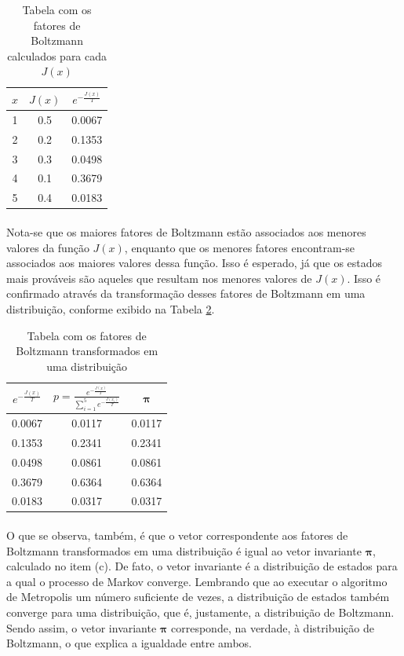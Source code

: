 \documentclass{report}
\begin{document}
\begin{table}[H]
	\centering
	\begin{tabular}{c|c|c}
	$x$ & $J(x)$ & $e^{- \frac{J(x)}{T}}$ \\ 
	\hline 
	1 & 0.5 & 0.0067 \\ 
	\hline 
	2 & 0.2 & 0.1353 \\ 
	\hline 
	3 & 0.3 & 0.0498 \\ 
	\hline 
	4 & 0.1 & 0.3679 \\ 
	\hline 
	5 & 0.4 & 0.0183 \\ 
	\end{tabular} 
	\caption{Tabela com os fatores de Boltzmann calculados para cada $J(x)$}
	\label{tabela_fatores_boltzmann}
\end{table}

\paragraph{} Nota-se que os maiores fatores de Boltzmann estão associados aos menores valores da função $J(x)$, enquanto que os menores fatores encontram-se associados aos maiores valores dessa função. Isso é esperado, já que os estados mais prováveis são aqueles que resultam nos menores valores de $J(x)$. Isso é confirmado através da transformação desses fatores de Boltzmann em uma distribuição, conforme exibido na Tabela \ref{tabela_distribuicao_boltzmann}.\\

\begin{table}
	\centering
	\begin{tabular}{c|c|c}
	$e^{- \frac{J(x)}{T}}$ & $p = \frac{e^{- \frac{J(x)}{T}}}{\sum_{i = 1}^{5} e^{- \frac{J(x_i)}{T}}}$ & $\boldsymbol{\pi}$ \\ 
	\hline 
	0.0067 & 0.0117 & 0.0117\\ 
	\hline 
	0.1353 & 0.2341 & 0.2341\\ 
	\hline 
	0.0498 & 0.0861 & 0.0861\\ 
	\hline 
	0.3679 & 0.6364 & 0.6364\\ 
	\hline 
	0.0183 & 0.0317 & 0.0317\\ 
	\end{tabular} 
	\caption{Tabela com os fatores de Boltzmann transformados em uma distribuição}
	\label{tabela_distribuicao_boltzmann}
\end{table}

\paragraph{} O que se observa, também, é que o vetor correspondente aos fatores de Boltzmann transformados em uma distribuição é igual ao vetor invariante $\boldsymbol{\pi}$, calculado no item (c). De fato, o vetor invariante é a distribuição de estados para a qual o processo de Markov converge. Lembrando que ao executar o algoritmo de Metropolis um número suficiente de vezes, a distribuição de estados também converge para uma distribuição, que é, justamente, a distribuição de Boltzmann. Sendo assim, o vetor invariante $\boldsymbol{\pi}$ corresponde, na verdade, à distribuição de Boltzmann, o que explica a igualdade entre ambos.\\
\end{document}
